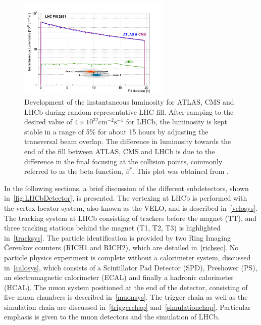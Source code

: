\begin{figure}
	\centering
        \includegraphics[width = 0.65\textwidth]{figs/detector/lumicompare.png}%
	\caption{Development of the instantaneous luminosity for \Gls{ATLAS}, \Gls{CMS} and \Gls{LHCb} during random representative LHC fill. After ramping to the desired value of $4\times10^{32}\mathrm{cm^{-2}s^{-1}}$
	for \Gls{LHCb}, the luminosity is kept stable in a range of 5$\%$ for about 15 hours by adjusting the transversal beam overlap. The difference in luminosity towards the end of the fill between \Gls{ATLAS}, \Gls{CMS} and \Gls{LHCb} is due to the difference in the final focusing at the collision points, commonly referred to as the beta function, $\beta^{*}$. This plot was obtained from \cite{LHCb-DP-2014-002}.}
	\label{fig:lhcbintlumi}
\end{figure}

In the following sections, a brief discussion of the different subdetectors, shown in~\autoref{fig:LHCbDetector}, is presented. The vertexing at \gls{LHCb} is performed with the vertex locator system, also known as the VELO, and is described in~\autoref{velosys}. The tracking system at \gls{LHCb} consisting of trackers before the magnet (TT), and three tracking stations behind the magnet (T1, T2, T3) is highlighted in~\autoref{tracksys}. The particle identification is provided by two Ring Imaging \v{C}erenkov counters (RICH1 and RICH2), which are detailed in~\autoref{richsec}. No particle physics experiment is complete without a calorimeter system, discussed in~\autoref{calosys}, which consists of a Scintillator Pad Detector (SPD), Preshower (PS), an electromagnetic calorimeter (ECAL) and finally a hadronic calorimeter (HCAL). The muon system positioned at the end of the detector, consisting of five muon chambers is described in~\autoref{muonsys}. The trigger chain as well as the simulation chain are discussed in~\autoref{triggerchap} and~\autoref{simulationchap}. Particular emphasis is given to the muon detectors and the simulation of \gls{LHCb}.

